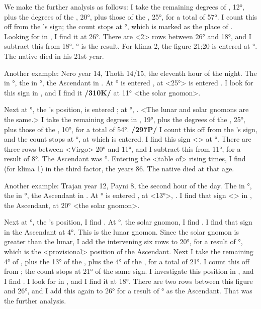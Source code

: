 We make the further analysis as follows: I take the remaining degrees of \Virgo, 12°, plus the degrees of the \Sun, 20°, plus those of the \Moon, 25°, for a total of 57°. I count this off from the \Moon’s sign; the count stops at \Cancer\xspace 27°, which is marked as the place of \Aquarius. Looking for \Aquarius\xspace in \Virgo, I find it at 26°. There are <2> rows between 26° and 18°, and I subtract this from 18°. \Virgo\xspace 16° is the result. For klima 2, the figure 21;20 is entered at \Virgo\xspace 16°. The native died in his 21st year.

Another example: Nero year 14, Thoth 14/15, the eleventh hour of the night. The \Sun\xspace in °, the \Moon\xspace in \Aries\xspace 10°, the Ascendant in \Virgo. At \Virgo\xspace 25° is entered \Capricorn, at \Capricorn\xspace <25°> is entered \Scorpio. I look for this sign in \Virgo, and I find it \textbf{/310K/} at 11° <the solar gnomon>. 

Next at \Aries\xspace 10°, the \Moon’s position, is entered \Virgo; at \Virgo\xspace 11°, \Scorpio. <The lunar and solar gnomons
are the same.> I take the remaining degrees in \Virgo, 19°, plus the degrees of the \Sun, 25°, plus those of the \Moon, 10°, for a total of 54°. \textbf{/297P/} I count this off from the \Moon’s sign, and the count stops at \Taurus\xspace 24°, at which \Cancer\xspace is entered. I find this sign <\Cancer> at °. There are three rows between <Virgo> 20° and 11°, and I subtract this from 11°, for a result of 8°. The Ascendant was \Virgo\xspace
8°. Entering the <table of> rising times, I find (for klima 1) in the third factor, the years 86. The native died at that age.

Another example: Trajan year 12, Payni 8, the second hour of the day. The \Sun\xspace in \Gemini\xspace 13°, the \Moon\xspace in \Capricorn\xspace 4°, the Ascendant in \Cancer. At \Gemini\xspace 13° is entered \Libra, at \Libra <13°>, \Virgo. I find that sign <\Virgo> in \Cancer, the Ascendant, at 20° <the solar gnomon>. 

Next at \Capricorn\xspace 4°, the \Moon’s position, I find \Virgo. At \Virgo\xspace 20°, the solar gnomon, I find \Cancer. I find that sign in the Ascendant at 4°. This is the lunar gnomon. Since the solar gnomon is greater than the lunar, I add the intervening six rows to 20°, for a result of \Cancer\xspace 26°, which is the <provisional> position of the Ascendant. Next I take the remaining 4° of \Cancer, plus the 13° of the \Sun, plus the 4° of the \Moon, for a total of 21°. I count this off from \Capricorn; the count stops at 21° of the same sign. I investigate this position in \Capricorn, and I find \Libra. I look for \Libra\xspace in \Cancer, and I find it at 18°. There are two rows between this figure and 26°, and I add this again to 26° for a result of \Cancer \xspace28° as the Ascendant. That was the further analysis. 

